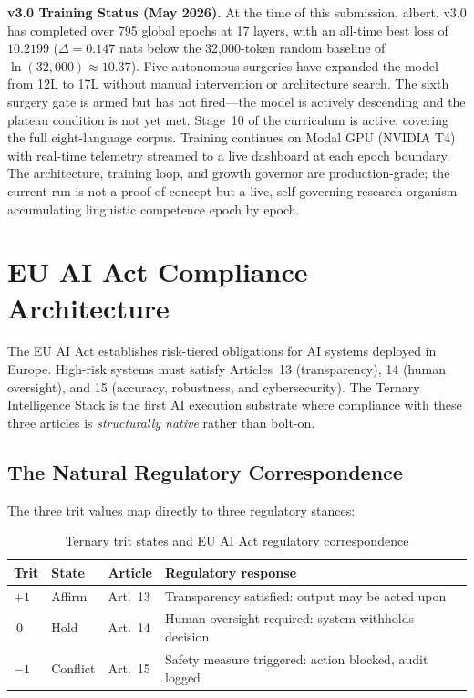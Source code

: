\documentclass[journal,10pt,twocolumn]{IEEEtran}
\begin{document}
\textbf{v3.0 Training Status (May 2026).}
At the time of this submission, albert. v3.0 has completed over 795
global epochs at 17 layers, with an all-time best loss of $10.2199$
($\Delta = 0.147$ nats below the 32{,}000-token random baseline of
$\ln(32{,}000) \approx 10.37$). Five autonomous surgeries have expanded
the model from 12L to 17L without manual intervention or architecture
search. The sixth surgery gate is armed but has not fired---the model
is actively descending and the plateau condition is not yet met.
Stage~10 of the curriculum is active, covering the full eight-language
corpus. Training continues on Modal GPU (NVIDIA T4) with real-time
telemetry streamed to a live dashboard at each epoch boundary.
The architecture, training loop, and growth governor are production-grade;
the current run is not a proof-of-concept but a live, self-governing
research organism accumulating linguistic competence epoch by epoch.

\section{EU AI Act Compliance Architecture}
\label{sec:euaiact}

The EU AI Act establishes risk-tiered obligations for AI systems deployed in
Europe. High-risk systems must satisfy Articles~13 (transparency), 14 (human
oversight), and 15 (accuracy, robustness, and cybersecurity). The Ternary
Intelligence Stack is the first AI execution substrate where compliance with
these three articles is \emph{structurally native} rather than bolt-on.

\subsection{The Natural Regulatory Correspondence}

The three trit values map directly to three regulatory stances:

\begin{table}[h]
\centering
\small
\caption{Ternary trit states and EU AI Act regulatory correspondence}
\label{tab:euaiact}
\begin{tabular}{p{1.0cm}p{1.4cm}p{1.3cm}p{3.4cm}}
\toprule
Trit & State & Article & Regulatory response \\
\midrule
$+1$ & Affirm & Art.~13 & Transparency satisfied: output may be acted upon \\
$\ 0$ & Hold & Art.~14 & Human oversight required: system withholds decision \\
$-1$ & Conflict & Art.~15 & Safety measure triggered: action blocked, audit logged \\
\bottomrule
\end{tabular}
\end{table}
\end{document}
